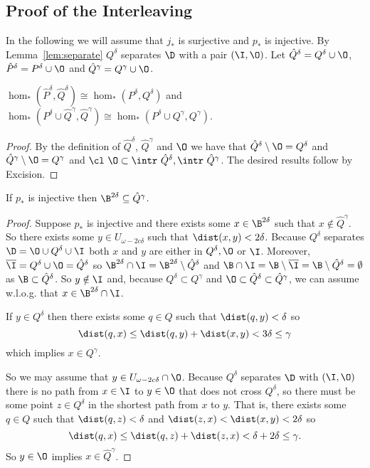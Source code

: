
\subsection{Proof of the Interleaving}

In the following we will assume that $j_*$ is surjective and $p_*$ is injective.
By Lemma~\ref{lem:separate} $Q^\delta$ separates $\D$ with a pair $(\I, \O)$.
Let $\hat{Q}^\delta = Q^\delta \cup \O$, $\hat{P}^\delta = P^\delta \cup \O$ and $\hat{Q}^\gamma = Q^\gamma \cup \O$.

\begin{lemma}
    $\hom_*(\hat{P}^\delta, \hat{Q}^\delta)\cong \hom_*(P^\delta, Q^\delta)$ and $\hom_*(P^\delta\cup\hat{Q}^\gamma, \hat{Q}^\gamma)\cong \hom_*(P^\delta\cup Q^\gamma, Q^\gamma)$.
\end{lemma}
\begin{proof}
    By the definition of $\hat{Q}^\delta$, $\hat{Q}^\gamma$ and $\O$ we have that $\hat{Q}^\delta\setminus\O = Q^\delta$ and $\hat{Q}^\gamma\setminus\O = Q^\gamma$ and $\cl~\O \subset \intr~\hat{Q}^\delta, \intr~\hat{Q}^\gamma$.
    The desired results follow by Excision.
\end{proof}

\begin{lemma}\label{lem:qcontain}
    If $p_*$ is injective then $\B^{2\delta}\subseteq \hat{Q}^\gamma$.
\end{lemma}
\begin{proof}
    Suppose $p_*$ is injective and there exists some $x\in \B^{2\delta}$ such that $x\notin \hat{Q}^\gamma$.
    So there exists some $y\in U_{\omega - 2c\delta}$ such that $\dist(x, y) < 2\delta$.
    Because $Q^\delta$ separates $\D = \O \cup Q^\delta \cup \I$ both $x$ and $y$ are either in $Q^\delta, \O$ or $\I$.
    Moreover, $\overline{\I} = Q^\delta \cup \O = \hat{Q}^\delta$ so $\B^{2\delta}\cap\I = \B^{2\delta}\setminus \hat{Q}^\delta$ and $\B\cap\I = \B\setminus \overline{\I} = \B\setminus \hat{Q}^\delta = \emptyset$ as $\B\subset \hat{Q}^\delta$.
    So $y\notin \I$ and, because $Q^\delta \subset Q^\gamma$ and $\O\subset \hat{Q}^\delta\subset\hat{Q}^\gamma$, we can assume w.l.o.g. that $x\in \B^{2\delta}\cap\I$.

    If $y\in Q^\delta$ then there exists some $q\in Q$ such that $\dist(q, y) < \delta$ so
    \[ \dist(q, x)\leq \dist(q, y) + \dist(x, y) < 3\delta\leq\gamma \]
    which implies $x \in Q^\gamma$.

    So we may assume that $y\in U_{\omega - 2c\delta}\cap\O$.
    Because $Q^\delta$ separates $\D$ with $(\I, \O)$ there is no path from $x\in \I$ to $y\in\O$ that does not cross $Q^\delta$, so there must be some point $z\in Q^\delta$ in the shortest path from $x$ to $y$.
    That is, there exists some $q\in Q$ such that $\dist(q, z) < \delta$ and $\dist(z, x) < \dist(x, y) < 2\delta$ so
    \[ \dist(q, x)\leq \dist(q, z) + \dist(z, x) < \delta + 2\delta \leq \gamma. \]
    So $y\in\O$ implies $x\in\hat{Q}^\gamma$.

\end{proof}

